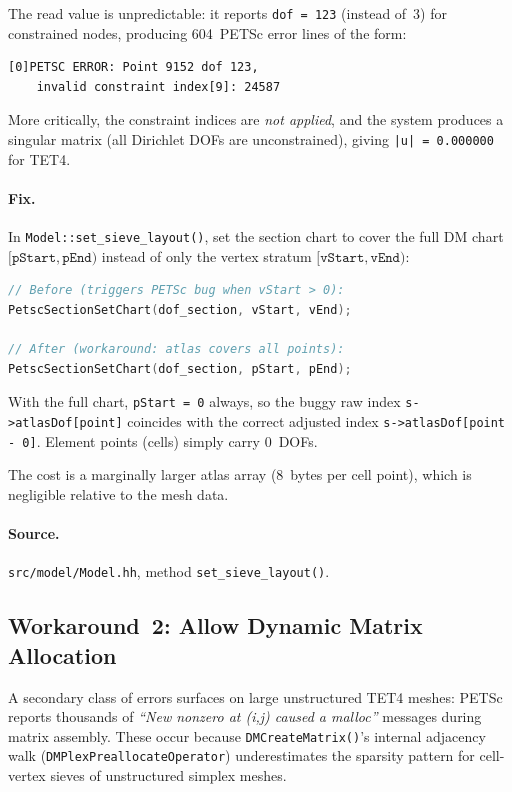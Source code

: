 The read value is unpredictable: it reports \texttt{dof = 123} (instead of~3)
for constrained nodes, producing 604~PETSc error lines of the form:
\begin{lstlisting}[basicstyle=\ttfamily\footnotesize,numbers=none]
[0]PETSC ERROR: Point 9152 dof 123,
    invalid constraint index[9]: 24587
\end{lstlisting}
More critically, the constraint indices are \emph{not applied}, and the
system produces a singular matrix (all Dirichlet DOFs are unconstrained),
giving \texttt{|u| = 0.000000} for TET4.

\paragraph{Fix.}
In \texttt{Model::set\_sieve\_layout()}, set the section chart to cover the
full DM chart $[\texttt{pStart}, \texttt{pEnd})$ instead of only the vertex
stratum $[\texttt{vStart}, \texttt{vEnd})$:
\begin{lstlisting}[language=C++]
// Before (triggers PETSc bug when vStart > 0):
PetscSectionSetChart(dof_section, vStart, vEnd);

// After (workaround: atlas covers all points):
PetscSectionSetChart(dof_section, pStart, pEnd);
\end{lstlisting}
With the full chart, \texttt{pStart = 0} always, so the buggy raw index
\texttt{s->atlasDof[point]} coincides with the correct adjusted index
\texttt{s->atlasDof[point - 0]}.  Element points (cells) simply carry 0~DOFs.

The cost is a marginally larger atlas array (8~bytes per cell point), which is
negligible relative to the mesh data.

\paragraph{Source.} \texttt{src/model/Model.hh}, method \texttt{set\_sieve\_layout()}.


\subsection{Workaround~2: Allow Dynamic Matrix Allocation}
\label{sec:workaround_prealloc}

A secondary class of errors surfaces on large unstructured TET4 meshes: PETSc
reports thousands of \emph{``New nonzero at (i,j) caused a malloc''}
messages during matrix assembly.  These occur because
\texttt{DMCreateMatrix()}'s internal adjacency walk
(\texttt{DMPlexPreallocateOperator}) underestimates the sparsity pattern for
cell-vertex sieves of unstructured simplex meshes.

